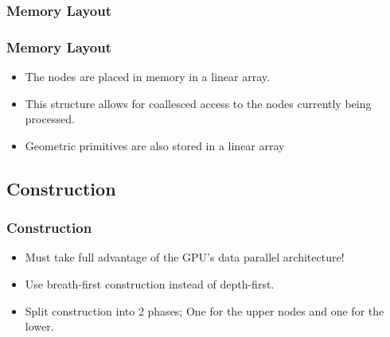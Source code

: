 \documentclass{beamer}
\begin{document}
\subsubsection{Memory Layout}
\begin{frame}
  \frametitle{Memory Layout}

  \begin{itemize}
  \item The nodes are placed in memory in a linear array.
    
  \item This structure allows for coallesced access to the nodes currently being
    processed.
  \item Geometric primitives are also stored in a linear array
  \end{itemize}
\end{frame}

\subsection{Construction}
\begin{frame}
  \frametitle{Construction}
  
  \begin{itemize}
    \item Must take full advantage of the GPU's data parallel architecture!
    \item Use breath-first construction instead of depth-first.
    \item Split construction into 2 phases; One for the upper nodes and one for
      the lower.
  \end{itemize}
\end{frame}
\end{document}

